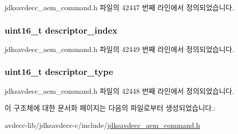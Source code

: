 jdksavdecc\+\_\+aem\+\_\+command.\+h 파일의 42447 번째 라인에서 정의되었습니다.

\subsubsection[{\texorpdfstring{descriptor\+\_\+index}{descriptor_index}}]{\setlength{\rightskip}{0pt plus 5cm}uint16\+\_\+t descriptor\+\_\+index}\hypertarget{structjdksavdecc__aem__command__disable__stream__encryption_a042bbc76d835b82d27c1932431ee38d4}{}\label{structjdksavdecc__aem__command__disable__stream__encryption_a042bbc76d835b82d27c1932431ee38d4}


jdksavdecc\+\_\+aem\+\_\+command.\+h 파일의 42449 번째 라인에서 정의되었습니다.

\subsubsection[{\texorpdfstring{descriptor\+\_\+type}{descriptor_type}}]{\setlength{\rightskip}{0pt plus 5cm}uint16\+\_\+t descriptor\+\_\+type}\hypertarget{structjdksavdecc__aem__command__disable__stream__encryption_ab7c32b6c7131c13d4ea3b7ee2f09b78d}{}\label{structjdksavdecc__aem__command__disable__stream__encryption_ab7c32b6c7131c13d4ea3b7ee2f09b78d}


jdksavdecc\+\_\+aem\+\_\+command.\+h 파일의 42448 번째 라인에서 정의되었습니다.



이 구조체에 대한 문서화 페이지는 다음의 파일로부터 생성되었습니다.\+:\begin{DoxyCompactItemize}
\item 
avdecc-\/lib/jdksavdecc-\/c/include/\hyperlink{jdksavdecc__aem__command_8h}{jdksavdecc\+\_\+aem\+\_\+command.\+h}\end{DoxyCompactItemize}
